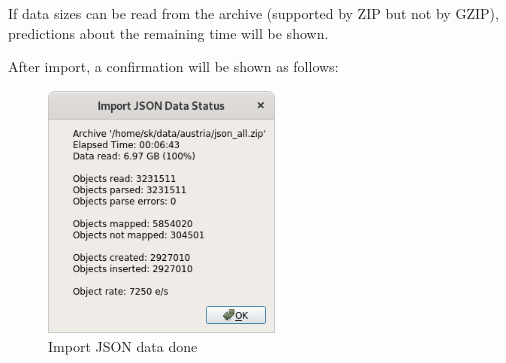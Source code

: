 If data sizes can be read from the archive (supported by ZIP but not by GZIP), predictions about the remaining time will be shown.

After import, a confirmation will be shown as follows:

\begin{figure}[H]
  \center
    \includegraphics[width=6cm,frame]{figures/json_import_done.png}
  \caption{Import JSON data done}
\end{figure}



